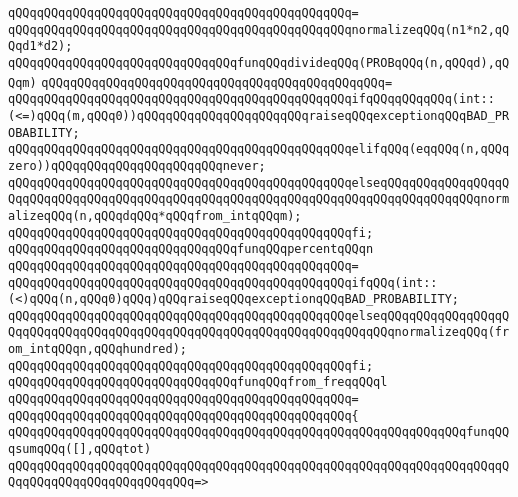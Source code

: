 \verb|qQQqqQQqqQQqqQQqqQQqqQQqqQQqqQQqqQQqqQQqqQQqqQQq=|\newline
\verb|qQQqqQQqqQQqqQQqqQQqqQQqqQQqqQQqqQQqqQQqqQQqqQQqnormalizeqQQq(n1*n2,qQQqd1*d2);|\newline
\newline
\verb|qQQqqQQqqQQqqQQqqQQqqQQqqQQqqQQqfunqQQqdivideqQQq(PROBqQQq(n,qQQqd),qQQqm)|\newline
\verb|qQQqqQQqqQQqqQQqqQQqqQQqqQQqqQQqqQQqqQQqqQQqqQQq=|\newline
\verb|qQQqqQQqqQQqqQQqqQQqqQQqqQQqqQQqqQQqqQQqqQQqqQQqifqQQqqQQqqQQq(int::(<=)qQQq(m,qQQq0))qQQqqQQqqQQqqQQqqQQqqQQqraiseqQQqexceptionqQQqBAD_PROBABILITY;|\newline
\verb|qQQqqQQqqQQqqQQqqQQqqQQqqQQqqQQqqQQqqQQqqQQqqQQqelifqQQq(eqqQQq(n,qQQqzero))qQQqqQQqqQQqqQQqqQQqqQQqnever;|\newline
\verb|qQQqqQQqqQQqqQQqqQQqqQQqqQQqqQQqqQQqqQQqqQQqqQQqelseqQQqqQQqqQQqqQQqqQQqqQQqqQQqqQQqqQQqqQQqqQQqqQQqqQQqqQQqqQQqqQQqqQQqqQQqqQQqqQQqqQQqnormalizeqQQq(n,qQQqdqQQq*qQQqfrom_intqQQqm);|\newline
\verb|qQQqqQQqqQQqqQQqqQQqqQQqqQQqqQQqqQQqqQQqqQQqqQQqfi;|\newline
\newline
\verb|qQQqqQQqqQQqqQQqqQQqqQQqqQQqqQQqfunqQQqpercentqQQqn|\newline
\verb|qQQqqQQqqQQqqQQqqQQqqQQqqQQqqQQqqQQqqQQqqQQqqQQq=|\newline
\verb|qQQqqQQqqQQqqQQqqQQqqQQqqQQqqQQqqQQqqQQqqQQqqQQqifqQQq(int::(<)qQQq(n,qQQq0)qQQq)qQQqraiseqQQqexceptionqQQqBAD_PROBABILITY;|\newline
\verb|qQQqqQQqqQQqqQQqqQQqqQQqqQQqqQQqqQQqqQQqqQQqqQQqelseqQQqqQQqqQQqqQQqqQQqqQQqqQQqqQQqqQQqqQQqqQQqqQQqqQQqqQQqqQQqqQQqqQQqqQQqnormalizeqQQq(from_intqQQqn,qQQqhundred);|\newline
\verb|qQQqqQQqqQQqqQQqqQQqqQQqqQQqqQQqqQQqqQQqqQQqqQQqfi;|\newline
\newline
\verb|qQQqqQQqqQQqqQQqqQQqqQQqqQQqqQQqfunqQQqfrom_freqqQQql|\newline
\verb|qQQqqQQqqQQqqQQqqQQqqQQqqQQqqQQqqQQqqQQqqQQqqQQq=|\newline
\verb|qQQqqQQqqQQqqQQqqQQqqQQqqQQqqQQqqQQqqQQqqQQqqQQq{|\newline
\verb|qQQqqQQqqQQqqQQqqQQqqQQqqQQqqQQqqQQqqQQqqQQqqQQqqQQqqQQqqQQqqQQqfunqQQqsumqQQq([],qQQqtot)|\newline
\verb|qQQqqQQqqQQqqQQqqQQqqQQqqQQqqQQqqQQqqQQqqQQqqQQqqQQqqQQqqQQqqQQqqQQqqQQqqQQqqQQqqQQqqQQqqQQqqQQq=>|\newline
